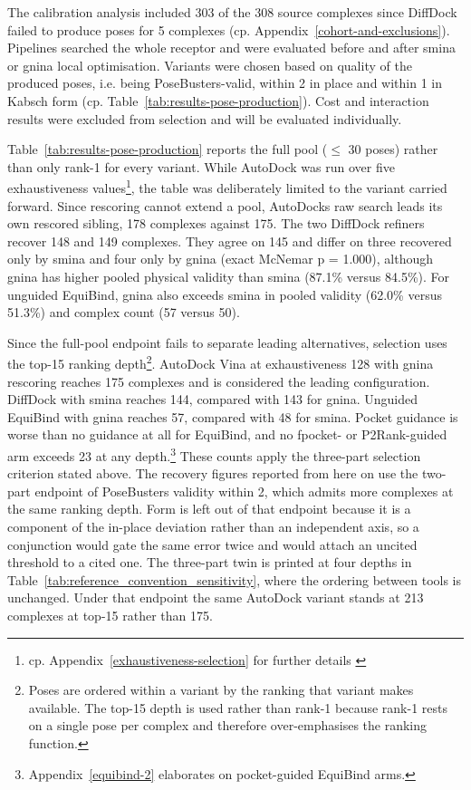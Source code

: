 The calibration analysis included 303 of the 308 source complexes since DiffDock failed to produce poses for 5 complexes (cp. Appendix~\ref{cohort-and-exclusions}). Pipelines searched the whole receptor and were evaluated before and after smina or gnina local optimisation. Variants were chosen based on quality of the produced poses, i.e. being PoseBusters-valid, within 2\angstrom{} in place and within 1\angstrom{} in Kabsch form (cp. Table~\ref{tab:results-pose-production}). Cost and interaction results were excluded from selection and will be evaluated individually.

Table~\ref{tab:results-pose-production} reports the full pool ($\leq$ 30 poses) rather than only rank-1 for every variant. While AutoDock was run over five exhaustiveness values\footnote{cp. Appendix~\ref{exhaustiveness-selection} for further details \label{Autodock_variant_details}}, the table was deliberately limited to the variant carried forward. Since rescoring cannot extend a pool, AutoDock\textquotesingle{}s raw search leads its own rescored sibling, 178 complexes against 175. The two DiffDock refiners recover 148 and 149 complexes. They agree on 145 and differ on three recovered only by smina and four only by gnina (exact McNemar p = 1.000), although gnina has higher pooled physical validity than smina (87.1\% versus 84.5\%). For unguided EquiBind, gnina also exceeds smina in pooled validity (62.0\% versus 51.3\%) and complex count (57 versus 50).

Since the full-pool endpoint fails to separate leading alternatives, selection uses the top-15 ranking depth\footnote{Poses are ordered within a variant by the ranking that variant makes available. The top-15 depth is used rather than rank-1 because rank-1 rests on a single pose per complex and therefore over-emphasises the ranking function.}. AutoDock Vina at exhaustiveness 128 with gnina rescoring reaches 175 complexes and is considered the leading configuration. DiffDock with smina reaches 144, compared with 143 for gnina. Unguided EquiBind with gnina reaches 57, compared with 48 for smina. Pocket guidance is worse than no guidance at all for EquiBind, and no fpocket- or P2Rank-guided arm exceeds 23 at any depth.\footnote{Appendix~\ref{equibind-2} elaborates on pocket-guided EquiBind arms.} These counts apply the three-part selection criterion stated above. The recovery figures reported from here on use the two-part endpoint of PoseBusters validity within 2\angstrom{}, which admits more complexes at the same ranking depth. Form is left out of that endpoint because it is a component of the in-place deviation rather than an independent axis, so a conjunction would gate the same error twice and would attach an uncited threshold to a cited one. The three-part twin is printed at four depths in Table~\ref{tab:reference_convention_sensitivity}, where the ordering between tools is unchanged. Under that endpoint the same AutoDock variant stands at 213 complexes at top-15 rather than 175.

